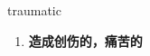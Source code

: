 
\begin{frame}
{\huge traumatic}
\begin{center}
\begin{enumerate}\Large
  \item \textbf{造成创伤的，痛苦的}
\end{enumerate}
\end{center}
\end{frame}
